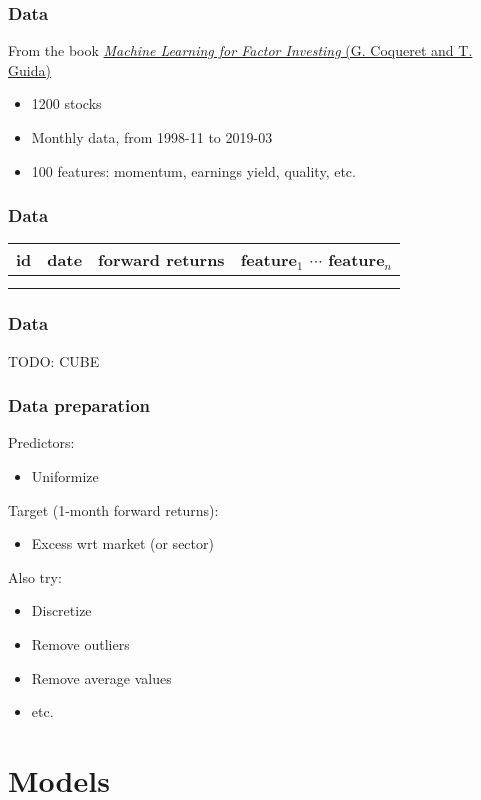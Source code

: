 \documentclass[a4paper,12pt,compress,serif]{beamer}
\begin{document}
\begin{frame}
  \frametitle{Data}
  From the book \href{http://www.mlfactor.com/}{\emph{Machine Learning for Factor Investing} (G. Coqueret and T. Guida)}
  \begin{itemize}
  \item 1200 stocks
  \item Monthly data, from 1998-11 to 2019-03
  \item 100 features: momentum, earnings yield, quality, etc.
  \end{itemize}
\end{frame}

\begin{frame}
  \frametitle{Data}
  \centering
  \begin{tabular}{c|c|c|c}
    id & date & forward returns & feature$_1$ \quad $\cdots$ \quad feature$_n$ \\
    \hline
    &&& \\
    &&&
  \end{tabular}
\end{frame}

\begin{frame}
  \frametitle{Data}
  TODO: CUBE
\end{frame}

\begin{frame}
  \frametitle{Data preparation}
  Predictors:
  \begin{itemize}
  \item Uniformize
  \end{itemize}

  \bigskip
  Target (1-month forward returns):
  \begin{itemize}
  \item Excess wrt market (or sector)
  \end{itemize}

  \bigskip
  Also try:
  \begin{itemize}
  \item Discretize
  \item Remove outliers
  \item Remove average values
  \item etc.
  \end{itemize}
\end{frame}

\section{Models}
\end{document}
